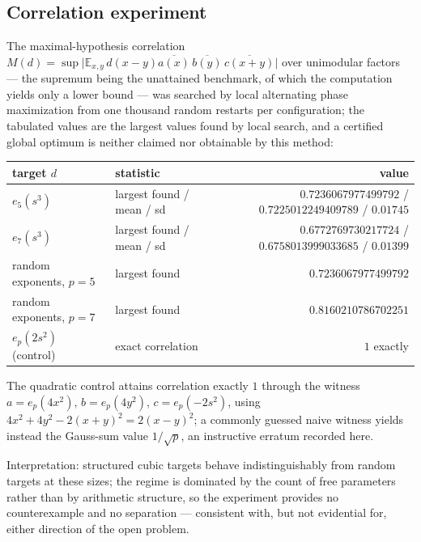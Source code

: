 \documentclass[11pt]{article}
\begin{document}
\subsection{Correlation experiment}
The maximal-hypothesis correlation
$M(d)=\sup\bigl|\mathbb{E}_{x,y}\,d(x-y)\overline{a(x)}\,\overline{b(y)}\,
\overline{c(x+y)}\bigr|$ over unimodular factors — the supremum being the
unattained benchmark, of which the computation yields only a lower bound —
was searched by local alternating phase maximization from one thousand random
restarts per configuration; the tabulated values are the largest values found
by local search, and a certified global optimum is neither claimed nor
obtainable by this method:
\begin{center}
\begin{tabular}{llr}
\toprule
target $d$ & statistic & value \\
\midrule
$e_5(s^{3})$ & largest found / mean / sd & $0.7236067977499792$ / $0.7225012249409789$ / $0.01745$ \\
$e_7(s^{3})$ & largest found / mean / sd & $0.6772769730217724$ / $0.6758013999033685$ / $0.01399$ \\
random exponents, $p=5$ & largest found & $0.7236067977499792$ \\
random exponents, $p=7$ & largest found & $0.8160210786702251$ \\
$e_p(2s^{2})$ (control) & exact correlation & $1$ exactly \\
\bottomrule
\end{tabular}
\end{center}
The quadratic control attains correlation exactly $1$ through the witness
$a=e_p(4x^{2})$, $b=e_p(4y^{2})$, $c=e_p(-2s^{2})$, using
$4x^{2}+4y^{2}-2(x+y)^{2}=2(x-y)^{2}$; a commonly guessed naive witness yields
instead the Gauss-sum value $1/\sqrt{p}$, an instructive erratum recorded here.

Interpretation: structured cubic targets behave indistinguishably from random
targets at these sizes; the regime is dominated by the count of free
parameters rather than by arithmetic structure, so the experiment provides no
counterexample and no separation — consistent with, but not evidential for,
either direction of the open problem.
\end{document}
